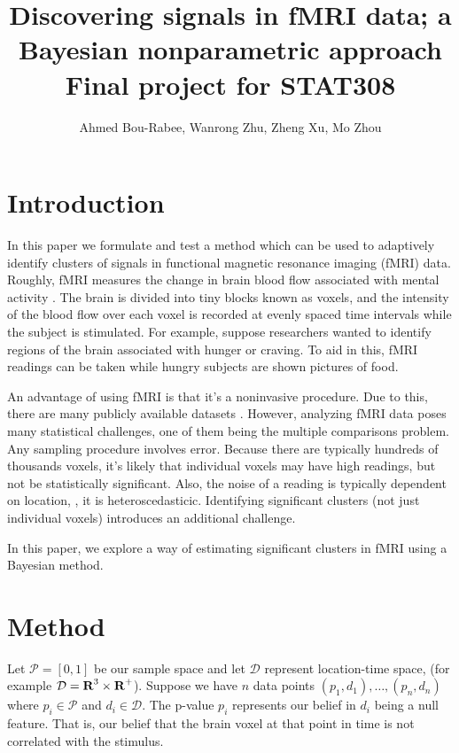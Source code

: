 \documentclass[12pt]{article}
\title{Discovering signals in fMRI data; 
a Bayesian nonparametric approach   \\ \large{Final project for STAT308}}
\author{Ahmed Bou-Rabee, Wanrong Zhu, Zheng Xu, Mo Zhou}
\begin{document}
\maketitle

\section{Introduction} 

In this paper we formulate and test a method which can be used to adaptively identify 
clusters of signals in functional magnetic resonance imaging (fMRI) data. 
Roughly, fMRI measures the change in brain blood flow associated 
with mental activity \cite{huettel2004functional}. The brain is divided into tiny blocks known as voxels, and the intensity 
of the blood flow over each voxel is recorded at evenly spaced time intervals while the subject is stimulated. For example, suppose researchers wanted to identify regions 
of the brain associated with hunger or craving. To aid in this, fMRI readings can be taken while hungry subjects are shown pictures of food. 

An advantage of using fMRI is that it's a noninvasive procedure.  Due to this, there are many publicly available datasets \cite{poldrack2013toward}.
However, analyzing fMRI data poses many statistical challenges, one of them being the multiple comparisons problem. 
 Any sampling procedure involves error.  Because there are typically hundreds of thousands voxels, it's likely that individual voxels 
 may have high readings, but not be statistically significant.  Also, the noise of a reading is typically dependent on location, \ie, it is heteroscedasticic.
 Identifying significant clusters (not just individual voxels) introduces an additional challenge. 
 
 In this paper, we explore a way of estimating significant clusters in fMRI using a Bayesian method. 

\section{Method}
Let $\mathcal{P} = [0,1]$ be our sample space and let $\mathcal{D}$ represent location-time space, (for example $\mathcal{D} = {\mbox{\bf R}}^3 \times {\mbox{\bf R}}^+$).
Suppose we have $n$ data points $(p_1, d_1), \ldots, (p_n, d_n)$ where $p_i \in \mathcal{P}$ and $d_i \in \mathcal{D}$. 
The p-value $p_i$ represents our belief in $d_i$ being a null feature. That is, our belief that the brain voxel at that point in time is not correlated 
with the stimulus.  
\end{document}

